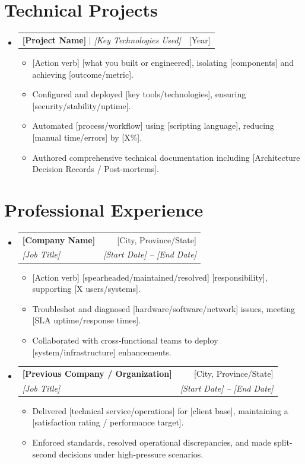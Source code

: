 \documentclass[letterpaper,10pt]{article}
\makeatletter
\newcommand{\resumeItem}[1]{
  \item\small{
    {#1 \vspace{-2pt}}
  }
}
\newcommand{\resumeSubheading}[4]{
  \vspace{-2pt}\item
    \begin{tabular*}{0.97\textwidth}[t]{l@{\extracolsep{\fill}}r}
      \textbf{#1} & #2 \\
      \textit{\small#3} & \textit{\small #4} \\
    \end{tabular*}\vspace{-7pt}
}
\newcommand{\resumeProjectHeading}[2]{
    \item
    \begin{tabular*}{0.97\textwidth}{l@{\extracolsep{\fill}}r}
      \small#1 & #2 \\
    \end{tabular*}\vspace{-7pt}
}
\newcommand{\resumeSubHeadingListStart}{\begin{itemize}[leftmargin=0.15in, label={}]}
\newcommand{\resumeSubHeadingListEnd}{\end{itemize}}
\newcommand{\resumeItemListStart}{\begin{itemize}}
\newcommand{\resumeItemListEnd}{\end{itemize}\vspace{-5pt}}
\makeatother
\begin{document}
\section{Technical Projects}
    \resumeSubHeadingListStart
      \resumeProjectHeading
          {\textbf{[Project Name]} $|$ \emph{[Key Technologies Used]}}{[Year]}
          \resumeItemListStart
            \resumeItem{[Action verb] [what you built or engineered], isolating [components] and achieving [outcome/metric].}
            \resumeItem{Configured and deployed [key tools/technologies], ensuring [security/stability/uptime].}
            \resumeItem{Automated [process/workflow] using [scripting language], reducing [manual time/errors] by [X\%].}
            \resumeItem{Authored comprehensive technical documentation including [Architecture Decision Records / Post-mortems].}
          \resumeItemListEnd
    \resumeSubHeadingListEnd

\section{Professional Experience}
  \resumeSubHeadingListStart
    \resumeSubheading
      {[Company Name]}{[City, Province/State]}
      {[Job Title]}{[Start Date] -- [End Date]}
      \resumeItemListStart
        \resumeItem{[Action verb] [spearheaded/maintained/resolved] [responsibility], supporting [X users/systems].}
        \resumeItem{Troubleshot and diagnosed [hardware/software/network] issues, meeting [SLA uptime/response times].}
        \resumeItem{Collaborated with cross-functional teams to deploy [system/infrastructure] enhancements.}
      \resumeItemListEnd

    \resumeSubheading
      {[Previous Company / Organization]}{[City, Province/State]}
      {[Job Title]}{[Start Date] -- [End Date]}
      \resumeItemListStart
        \resumeItem{Delivered [technical service/operations] for [client base], maintaining a [satisfaction rating / performance target].}
        \resumeItem{Enforced standards, resolved operational discrepancies, and made split-second decisions under high-pressure scenarios.}
      \resumeItemListEnd
  \resumeSubHeadingListEnd

\end{document}
